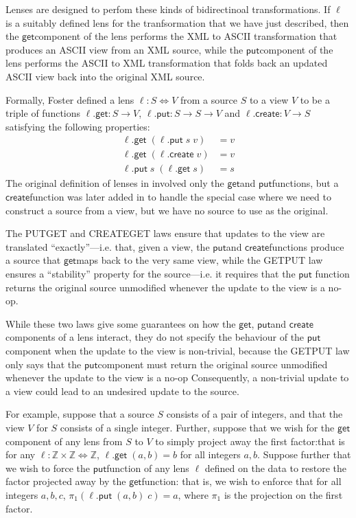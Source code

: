 \documentclass[acmsmall,review,anonymous]{acmart}\settopmatter{printfolios=true,printccs=false,printacmref=false}
\newcommand{\kw}[1]{\ensuremath{\mathsf{#1}}}
\newcommand{\get}{\ensuremath{\kw{get}}}
\newcommand{\pput}{\ensuremath{\kw{put}}}
\newcommand{\create}{\ensuremath{\kw{create}}}
\begin{document}
Lenses are designed to perfom these kinds of bidirectinoal transformations. If
$\ell$ is a suitably defined lens for the tranfsormation that we
have just described, then the \get component of the lens performs the
XML to ASCII transformation that produces an ASCII view from an XML source,
while the \pput component of the lens performs the ASCII to XML transformation
that folds back an updated ASCII view back into the original XML source.

Formally, Foster \cite{foster2007combinators,foster2009bidirectional} defined a lens $\ell :
S \Leftrightarrow V$ from a source $S$ to a view $V$ to be a triple of
functions $\ell.\get : S \longrightarrow V$, $\ell.\pput : S \longrightarrow S
\longrightarrow V$ and $\ell.\create : V \longrightarrow S$ satisfying the
following properties:
\begin{align*}
\ell.\get \; (\ell.\pput \; s \; v) &= v \tag{PUTGET}\\
\ell.\get \; (\ell.\create \; v) &= v \tag{CREATEGET}\\
\ell.\pput \; s \; (\ell.\get \; s) &= s \tag{GETPUT}
\end{align*}
The original definition of lenses in \cite{foster2007combinators} involved only
the \get and \pput functions, but a \create function was later added in
\cite{foster2009bidirectional} to handle the special case where we need to
construct a source from a view, but we have no source to use as the original. 

The PUTGET and CREATEGET laws ensure that updates to the view are translated
``exactly''---i.e. that, given a view, the \pput and \create functions produce
a source that \get maps back to the very same view, while the GETPUT law ensures
a ``stability'' property for the source---i.e. it requires that the \pput
function returns the original source unmodified whenever the update to the view
is a no-op.

While these two laws give some guarantees on how the \get, \pput and \create
components of a lens interact, they do not specify the behaviour of the \pput
component when the update to the view is non-trivial, because the GETPUT law
only says that the \pput component must return the original source unmodified
whenever the update to the view is a no-op Consequently, a non-trivial update
to a view could lead to an undesired update to the source.

For example, suppose that a source $S$ consists of a pair of integers, and
that the view $V$ for $S$ consists of a single integer. Further, suppose that we
wish for the \get component of any lens from $S$ to $V$ to simply project away
the first factor:that is for any $\ell : \mathbb{Z} \times \mathbb{Z}
\Leftrightarrow \mathbb{Z}$, $\ell.\get \; (a, b) = b$ for all integers $a, b$.
Suppose further that we wish to force the \pput function of any lens $\ell$
defined on the data to restore the factor projected away by the \get function:
that is, we wish to enforce that for all integers $a, b, c$, $\pi_1(\ell.\pput
\; (a, b) \; c) = a$, where $\pi_1$ is the projection on the first factor.
\end{document}
